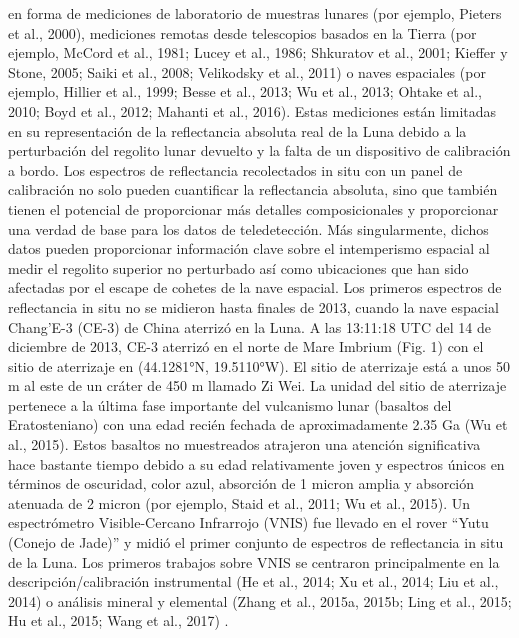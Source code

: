 \documentclass[12pt]{article}
\begin{document}
en forma de mediciones de laboratorio de muestras lunares (por ejemplo, Pieters et al., 2000), 
mediciones remotas desde telescopios basados en la Tierra (por ejemplo, McCord et al., 1981; 
Lucey et al., 1986; Shkuratov et al., 2001; Kieffer y Stone, 2005; Saiki et al., 2008; Velikodsky et al., 2011) 
o naves espaciales (por ejemplo, Hillier et al., 1999; Besse et al., 2013; Wu et al., 2013; 
Ohtake et al., 2010; Boyd et al., 2012; Mahanti et al., 2016). Estas mediciones están limitadas
en su representación de la reflectancia absoluta real de la Luna debido a la perturbación 
del regolito lunar devuelto 
y la falta de un dispositivo de calibración a bordo. Los espectros de reflectancia recolectados 
in situ con un panel de calibración no solo pueden cuantificar la reflectancia absoluta, 
sino que también tienen el potencial de proporcionar más detalles composicionales y 
proporcionar una verdad de base para los datos de teledetección. 
Más singularmente, dichos datos pueden proporcionar información clave sobre el intemperismo 
espacial al medir el regolito superior no perturbado 
así como ubicaciones que han sido afectadas por el escape de cohetes de la nave espacial. 
Los primeros espectros de reflectancia in situ no se midieron hasta finales de 2013, cuando 
la nave espacial Chang'E-3 (CE-3) de China aterrizó en la Luna. 
A las 13:11:18 UTC del 14 de diciembre de 2013, CE-3 aterrizó en el norte de Mare Imbrium 
(Fig. 1) con el sitio de aterrizaje en 
(44.1281°N, 19.5110°W). El sitio de aterrizaje está a unos 50 m al este de un cráter de 450 m 
llamado Zi Wei. 
La unidad del sitio de aterrizaje pertenece a la última fase importante del vulcanismo lunar 
(basaltos del Eratosteniano) con una edad recién fechada de aproximadamente 2.35 Ga (Wu et al., 2015). 
Estos basaltos no muestreados atrajeron una atención significativa hace bastante tiempo debido a 
su edad relativamente joven y espectros únicos en términos de oscuridad, color azul, absorción de 
1  micron amplia y absorción atenuada de 2 micron (por ejemplo, Staid et al., 2011; Wu et al., 2015). 
Un espectrómetro Visible-Cercano Infrarrojo (VNIS) fue llevado en el rover “Yutu (Conejo de Jade)” 
y midió el primer conjunto de espectros de reflectancia in situ de la Luna. 
Los primeros trabajos sobre VNIS se centraron principalmente en la descripción/calibración instrumental 
(He et al., 2014; Xu et al., 2014; Liu et al., 2014) o análisis mineral y elemental 
(Zhang et al., 2015a, 2015b; Ling et al., 2015; Hu et al., 2015; Wang et al., 2017) \parencite{McCord}.\\
\end{document}
